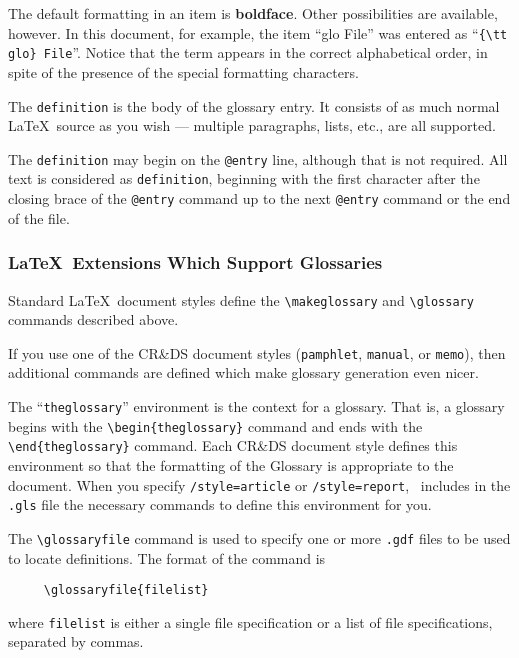 The default formatting in an item is {\bf boldface}.  Other possibilities are
available, however.  In this document, for example, the item ``glo File'' was
entered as ``\verb+{\tt glo} File+''.  Notice that the term appears in the
correct alphabetical order, in spite of the presence of the special formatting
characters.

The {\tt definition} is the body of the glossary entry.  It 
consists of as much normal \LaTeX\ source as you wish --- multiple paragraphs,
lists, etc., are all supported.  




The {\tt definition} may begin on the {\tt @entry} line, although that is not
required.  All text is considered as {\tt definition}, beginning with the first
character after the closing brace of the {\tt @entry} command up to the
next {\tt @entry} command or the end of the file.

\subsubsection{\LaTeX\ Extensions Which Support Glossaries}

Standard \LaTeX\ document styles define the \verb+\makeglossary+ and
\verb+\glossary+ commands described above.  

If you use one of the CR\&DS document styles ({\tt pamphlet}, {\tt manual}, or
{\tt memo}), then additional commands are defined which make glossary generation
even nicer.


The ``{\tt theglossary}'' environment is
the context for a glossary.  That is, a glossary begins with the
\verb+\begin{theglossary}+ command and ends with the \verb+\end{theglossary}+
command.  Each CR\&DS document style defines this environment so that the
formatting of the Glossary is appropriate to the document.  When you specify
{\tt /style=article} or {\tt /style=report}, \GloTeX\ includes in the 
{\tt .gls} file the necessary commands to define this environment for you.


The \verb+\glossaryfile+ command is used
to specify one or more {\tt .gdf} files to be used to locate definitions.
The format of the command is
\begin{verbatim}
     \glossaryfile{filelist}
\end{verbatim}
where {\tt filelist} is either a single file specification or a list of file
specifications, separated by commas.

